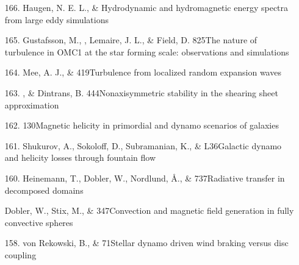\begin{itemize}
\item[{166.}]
Haugen, N. E. L., \& \Brandenburg{}
{Hydrodynamic and hydromagnetic energy spectra from large eddy simulations}

\item[{165.}]
Gustafsson, M., \Brandenburg, Lemaire, J. L., \& Field, D.
{825}{The nature of turbulence in OMC1 at the star forming scale:
observations and simulations}

\item[{164.}]
Mee, A. J., \& \Brandenburg{}
{419}{Turbulence from localized random expansion waves}

\item[{163.}]
\Brandenburg, \& Dintrans, B.
{444}{Nonaxisymmetric stability in the shearing sheet approximation}

\item[{162.}]
\Brandenburg{}
{130}{Magnetic helicity in primordial and dynamo scenarios of galaxies}

\item[{161.}]
Shukurov, A., Sokoloff, D., Subramanian, K., \& \Brandenburg{}
{L36}{Galactic dynamo and helicity losses through fountain flow}

\item[{160.}]
Heinemann, T., Dobler, W., Nordlund, \AA., \& \Brandenburg{}
{737}{Radiative transfer in decomposed domains}

\item[\important {159.}]
Dobler, W., Stix, M., \& \Brandenburg{}
{347}{Convection and magnetic field generation in fully convective spheres}

\item[{158.}]
von Rekowski, B., \& \Brandenburg{}
{71}{Stellar dynamo driven wind braking versus disc coupling}


\end{itemize}
